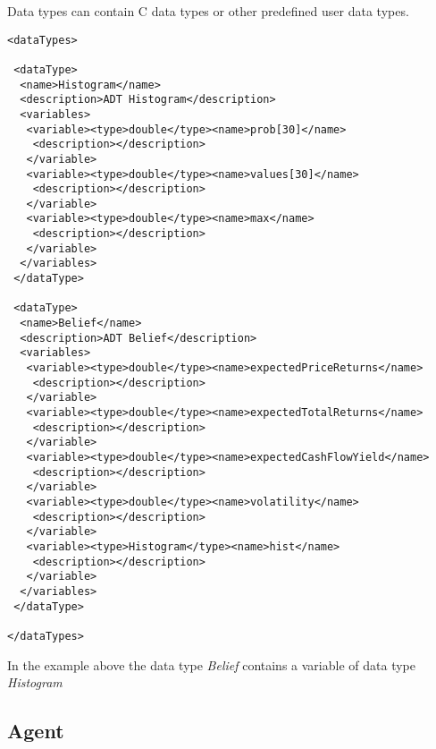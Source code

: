 Data types can contain C data types or other predefined user data types.

\begin{mylisting}
\begin{verbatim}
<dataTypes>

 <dataType>
  <name>Histogram</name>
  <description>ADT Histogram</description>
  <variables>
   <variable><type>double</type><name>prob[30]</name>
    <description></description>
   </variable>
   <variable><type>double</type><name>values[30]</name>
    <description></description>
   </variable>
   <variable><type>double</type><name>max</name>
    <description></description>
   </variable>
  </variables>
 </dataType>

 <dataType>
  <name>Belief</name>
  <description>ADT Belief</description>
  <variables>
   <variable><type>double</type><name>expectedPriceReturns</name>
    <description></description>
   </variable>
   <variable><type>double</type><name>expectedTotalReturns</name>
    <description></description>
   </variable>
   <variable><type>double</type><name>expectedCashFlowYield</name>
    <description></description>
   </variable>
   <variable><type>double</type><name>volatility</name>
    <description></description>
   </variable>
   <variable><type>Histogram</type><name>hist</name>
    <description></description>
   </variable>
  </variables>
 </dataType>

</dataTypes>
\end{verbatim}
\end{mylisting}

In the example above the data type \emph{Belief} contains a variable
of data type \emph{Histogram}

\subsection{Agent}


